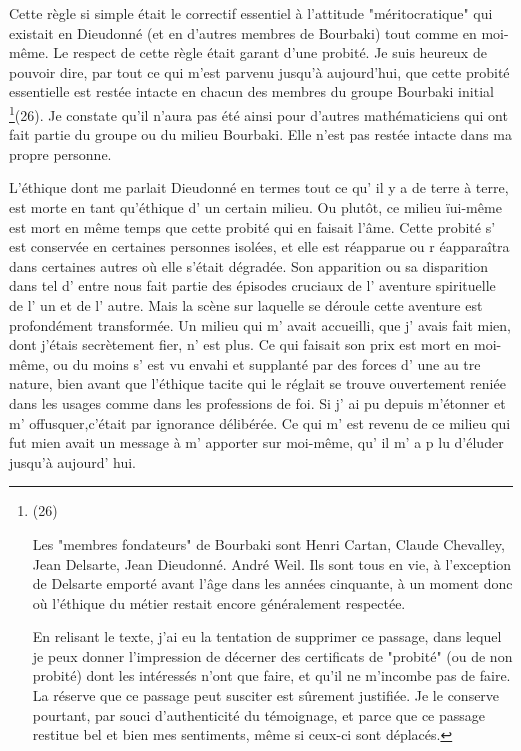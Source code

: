 Cette règle si simple était le correctif essentiel à l'attitude "méritocratique" qui existait en Dieudonné (et en d'autres membres de Bourbaki) tout comme en moi-même. Le respect de cette règle était garant d'une probité. Je suis heureux de pouvoir dire, par tout ce qui m'est parvenu jusqu'à aujourd'hui, que cette probité essentielle est restée intacte en chacun des membres du groupe Bourbaki initial \footnote{(26) \par Les "membres fondateurs" de Bourbaki sont Henri Cartan, Claude Chevalley, Jean Delsarte, Jean Dieudonné. André Weil. Ils sont tous en vie, à l'exception de Delsarte emporté avant l'âge dans les années cinquante, à un moment donc où l'éthique du métier restait encore généralement respectée. 

En relisant le texte, j'ai eu la tentation de supprimer ce passage, dans lequel je peux donner l'impression de décerner des certificats de "probité" (ou de non probité) dont les intéressés n'ont que faire, et qu'il ne m'incombe pas de faire. La réserve que ce passage peut susciter est sûrement justifiée. Je le conserve pourtant, par souci d'authenticité du témoignage, et parce que ce passage restitue bel et bien mes sentiments, même si ceux-ci sont déplacés.}(26). Je constate qu'il n'aura pas été ainsi pour d'autres mathématiciens qui ont fait partie du groupe ou du milieu Bourbaki. Elle n'est pas restée intacte dans ma propre personne.

L'éthique dont me parlait Dieudonné en termes tout ce qu' il y a de terre à terre, est morte en tant qu'éthique d' un certain milieu. Ou plutôt, ce milieu ïui-même est mort en même temps que cette probité qui en faisait l'âme. Cette probité s' est conservée en certaines personnes isolées, et elle est réapparue ou r éapparaîtra dans certaines autres où elle s'était dégradée. Son apparition ou sa disparition dans tel d' entre nous fait partie des épisodes cruciaux de l' aventure spirituelle de l' un et de l' autre. Mais la scène sur laquelle se déroule cette aventure est profondément transformée. Un milieu qui m' avait accueilli, que j' avais fait mien, dont j'étais secrètement fier, n' est plus. Ce qui faisait son prix est mort en moi-même, ou du moins s' est vu envahi et supplanté par des forces d' une au tre nature, bien avant que l'éthique tacite qui le réglait se trouve ouvertement reniée dans les usages comme dans les professions de foi. Si j' ai pu depuis m'étonner et m' offusquer,c'était par ignorance délibérée. Ce qui m' est revenu de ce milieu qui fut mien avait un message à m' apporter sur moi-même, qu' il m' a p lu d'éluder jusqu'à aujourd' hui.

